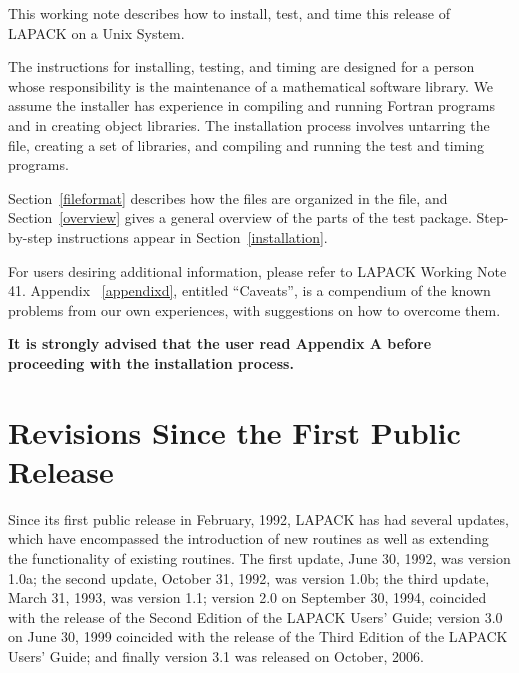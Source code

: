\documentclass[11pt]{report}
\begin{document}
This working note describes how to install, test, and time this
release of LAPACK on a Unix System.

The instructions for installing, testing, and timing are designed for a 
person whose
responsibility is the maintenance of a mathematical software library.
We assume the installer has experience in compiling and running 
Fortran programs and in creating object libraries.
The installation process involves untarring the file, creating a set of
libraries, and compiling and running the test and timing programs.


Section~\ref{fileformat} describes how the files are organized in the
file, and
Section~\ref{overview} gives a general overview of the parts of the test package.
Step-by-step instructions appear in Section~\ref{installation}.

For users desiring additional information, please refer to LAPACK
Working Note 41.
Appendix ~\ref{appendixd}, entitled ``Caveats'', is a compendium of the known 
problems from our own experiences, with suggestions on how to 
overcome them.

\textbf{It is strongly advised that the user read Appendix
A before proceeding with the installation process.}

\section{Revisions Since the First Public Release}

Since its first public release in February, 1992, LAPACK has had
several updates, which have encompassed the introduction of new routines
as well as extending the functionality of existing routines.  The first
update,
June 30, 1992, was version 1.0a; the second update, October 31, 1992,
was version 1.0b; the third update, March 31, 1993, was version 1.1;
version 2.0 on September 30, 1994, coincided with the release of the
Second Edition of the LAPACK Users' Guide; 
version 3.0 on June 30, 1999 coincided with the release of the Third Edition of
the LAPACK Users' Guide; and finally version 3.1 was
released on October, 2006.
\end{document}
